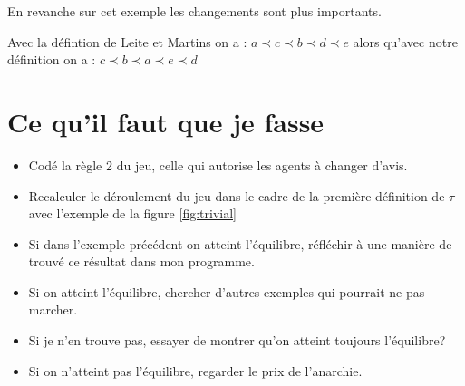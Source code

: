 \documentclass[12pt]{article}
\theoremstyle{defi}
\theoremstyle{not}
\theoremstyle{prob}
\begin{document}
En revanche sur cet exemple les changements sont plus importants.

Avec la défintion de Leite et Martins on a : $a \prec c \prec b \prec d \prec e$ alors qu'avec notre définition on a : $c \prec b \prec a \prec e \prec d$


\section{Ce qu'il faut que je fasse}

\begin{itemize}
  \item Codé la règle 2 du jeu, celle qui autorise les agents à changer d'avis.
  \item Recalculer le déroulement du jeu dans le cadre de la première définition de $\tau$ avec l'exemple de la figure \ref{fig:trivial}
  \item Si dans l'exemple précédent on atteint l'équilibre, réfléchir à une manière de trouvé ce résultat dans mon programme.
  \item Si on atteint l'équilibre, chercher d'autres exemples qui pourrait ne pas marcher.
  \item Si je n'en trouve pas, essayer de montrer qu'on atteint toujours l'équilibre?
  \item Si on n'atteint pas l'équilibre, regarder le prix de l'anarchie.
\end{itemize}
\end{document}

